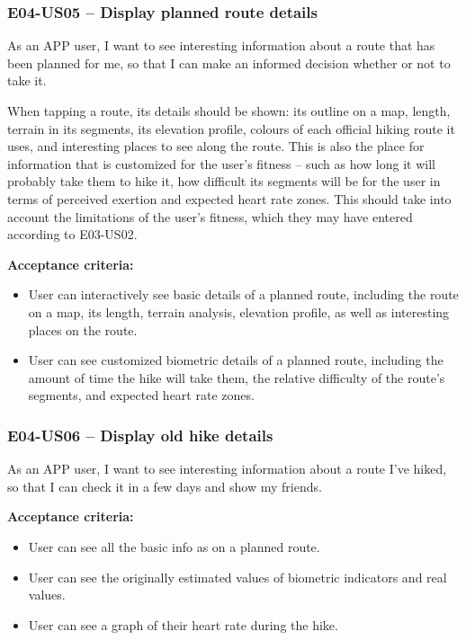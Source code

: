 \subsubsection*{E04-US05 -- Display planned route details}
As an APP user, I want to see interesting information about a route that has been planned for me, so that I can make an informed decision whether or not to take it.

When tapping a route, its details should be shown: its outline on a map, length, terrain in its segments, its elevation profile, colours of each official hiking route it uses, and interesting places to see along the route.
This is also the place for information that is customized for the user's fitness -- such as how long it will probably take them to hike it, how difficult its segments will be for the user in terms of perceived exertion and expected heart rate zones.
This should take into account the limitations of the user's fitness, which they may have entered according to E03-US02.

\textbf{Acceptance criteria:}
\begin{itemize}
    \item User can interactively see basic details of a planned route, including the route on a map, its length, terrain analysis, elevation profile, as well as interesting places on the route.
    \item User can see customized biometric details of a planned route, including the amount of time the hike will take them, the relative difficulty of the route's segments, and expected heart rate zones.
\end{itemize}

\subsubsection*{E04-US06 -- Display old hike details}
As an APP user, I want to see interesting information about a route I've hiked, so that I can check it in a few days and show my friends.

\textbf{Acceptance criteria:}
\begin{itemize}
    \item User can see all the basic info as on a planned route.
    \item User can see the originally estimated values of biometric indicators and real values.
    \item User can see a graph of their heart rate during the hike.
\end{itemize}

